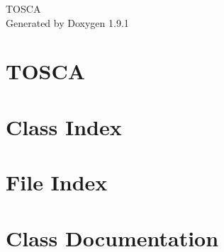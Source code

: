 \let\mypdfximage\pdfximage\def\pdfximage{\immediate\mypdfximage}\documentclass[twoside]{book}
\newcommand{\+}{\discretionary{\mbox{\scriptsize$\hookleftarrow$}}{}{}}
\newcommand{\clearemptydoublepage}{%
  \newpage{\pagestyle{empty}\cleardoublepage}%
}
\begin{document}
\raggedbottom

\hypersetup{pageanchor=false,
             bookmarksnumbered=true,
             pdfencoding=unicode
            }
\begin{titlepage}
\vspace*{7cm}
\begin{center}%
{\Large TOSCA }\\
\vspace*{1cm}
{\large Generated by Doxygen 1.9.1}\\
\end{center}
\end{titlepage}
\clearemptydoublepage
{}
\tableofcontents
\clearemptydoublepage
{}
\hypersetup{pageanchor=true}

\chapter{TOSCA}
\label{index}\hypertarget{index}{}
\chapter{Class Index}

\chapter{File Index}

\chapter{Class Documentation}



































































\end{document}
